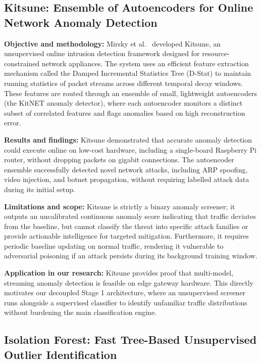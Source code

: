 \subsection{Kitsune: Ensemble of Autoencoders for Online Network Anomaly Detection}

\noindent\textbf{Objective and methodology:} Mirsky et al.~\cite{mirsky2018kitsune} developed Kitsune, an unsupervised online intrusion detection framework designed for resource-constrained network appliances. The system uses an efficient feature extraction mechanism called the Damped Incremental Statistics Tree (D-Stat) to maintain running statistics of packet streams across different temporal decay windows. These features are routed through an ensemble of small, lightweight autoencoders (the KitNET anomaly detector), where each autoencoder monitors a distinct subset of correlated features and flags anomalies based on high reconstruction error.

\smallskip
\noindent\textbf{Results and findings:} Kitsune demonstrated that accurate anomaly detection could execute online on low-cost hardware, including a single-board Raspberry Pi router, without dropping packets on gigabit connections. The autoencoder ensemble successfully detected novel network attacks, including ARP spoofing, video injection, and botnet propagation, without requiring labelled attack data during its initial setup.

\smallskip
\noindent\textbf{Limitations and scope:} Kitsune is strictly a binary anomaly screener; it outputs an uncalibrated continuous anomaly score indicating that traffic deviates from the baseline, but cannot classify the threat into specific attack families or provide actionable intelligence for targeted mitigation. Furthermore, it requires periodic baseline updating on normal traffic, rendering it vulnerable to adversarial poisoning if an attack persists during its background training window.

\smallskip
\noindent\textbf{Application in our research:} Kitsune provides proof that multi-model, streaming anomaly detection is feasible on edge gateway hardware. This directly motivates our decoupled Stage 1 architecture, where an unsupervised screener runs alongside a supervised classifier to identify unfamiliar traffic distributions without burdening the main classification engine.

\subsection{Isolation Forest: Fast Tree-Based Unsupervised Outlier Identification}

